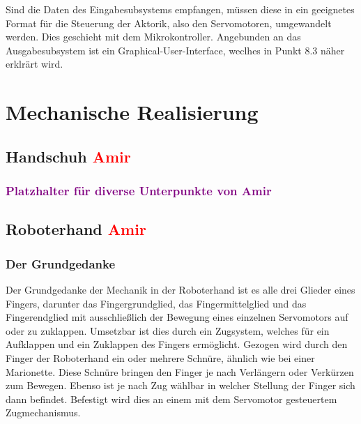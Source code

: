 \documentclass[titlepage,12pt,twoside]{article}
\begin{document}
Sind die Daten des Eingabesubsystems empfangen, müssen diese in ein geeignetes Format für die Steuerung der Aktorik, also den Servomotoren,
umgewandelt werden. Dies geschieht mit dem Mikrokontroller. Angebunden an das Ausgabesubsystem ist ein Graphical-User-Interface, 
weclhes in Punkt 8.3 näher erklrärt wird. \\


\section{Mechanische Realisierung}

\subsection{Handschuh \textcolor{red}{Amir}}
\subsubsection{\textcolor{purple}{Platzhalter für diverse Unterpunkte von Amir}}

\subsection{Roboterhand \textcolor{red}{Amir}}
\subsubsection{Der Grundgedanke}
Der Grundgedanke der Mechanik in der Roboterhand ist es alle drei Glieder eines Fingers,
darunter das Fingergrundglied, das Fingermittelglied und das Fingerendglied mit 
ausschließlich der Bewegung eines einzelnen Servomotors auf oder zu zuklappen. 
Umsetzbar ist dies durch ein Zugsystem, welches für ein Aufklappen und ein Zuklappen 
des Fingers ermöglicht. Gezogen wird durch den Finger der Roboterhand ein oder mehrere 
Schnüre, ähnlich wie bei einer Marionette. Diese Schnüre bringen den Finger je nach 
Verlängern oder Verkürzen zum Bewegen. Ebenso ist je nach Zug wählbar in welcher 
Stellung der Finger sich dann befindet. Befestigt wird dies an einem mit dem Servomotor 
gesteuertem Zugmechanismus. \\
\end{document}

